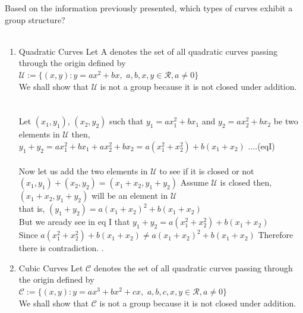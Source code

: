 \documentclass{article}
\begin{document}
Based on the information previously presented, which types of curves exhibit a group structure?\\\
\begin{enumerate}
    \item Quadratic Curves
Let A denotes the set of all quadratic curves passing through the origin defined by\\
$\mathcal{U}:=\{(x,y):y=ax^2+bx,$ $a,b,x,y \in \mathcal{R}, a \neq 0 \}$  \\
We shall show that $\mathcal{U}$ is not a group because it is not closed under addition.\\\\

\\
Let $(x_1,y_1)$, $(x_2,y_2)$ such that $y_1=ax_1^2+bx_1$ and $y_2=ax_2^2+bx_2$ be two elements in $\mathcal{U}$ 
then,\\

$y_1+y_2=ax_1^2+bx_1+ax_2^2+bx_2=a(x_1^2+x_2^2)+b(x_1+x_2)$ ....(eqI)\\\\
Now let us add the two elements in $\mathcal{U}$ to see if it is closed or not\\
$(x_1,y_1)+(x_2,y_2) =(x_1+x_2,y_1+y_2)$
Assume $\mathcal{U}$ is closed then, 
$(x_1+x_2,y_1+y_2)$ will be an element in $\mathcal{U}$\\
that is, $(y_1+y_2)=a(x_1+x_2)^2+b(x_1+x_2)$ \\
But we aready see in eq I that $ y_1+y_2=a(x_1^2+x_2^2)+b(x_1+x_2)$\\
Since $a(x_1^2+x_2^2)+b(x_1+x_2) \neq a(x_1+x_2)^2+b(x_1+x_2)$ Therefore there is contradiction. .

   \item Cubic Curves
Let $\mathcal{C}$ denotes the set of all quadratic curves passing through the origin defined by\\
$\mathcal{C}:=\{(x,y):y=ax^3+bx^2+cx,$ $a,b,c,x,y \in \mathcal{R}, a \neq 0 \}$  \\
We shall show that $\mathcal{C}$ is not a group because it is not closed under addition.\\\\


\end{enumerate}
\end{document}

